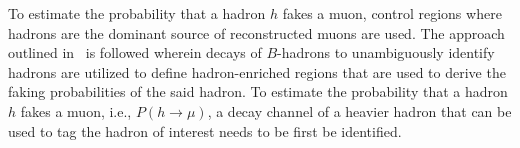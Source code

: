 To estimate the probability that a hadron \( h \) fakes a muon, control regions where hadrons are the dominant source of reconstructed muons are used.
The approach outlined in~\cite{run2muonfakes} is followed wherein decays of $B$-hadrons to unambiguously identify hadrons are utilized to define hadron-enriched regions that are used to derive the faking probabilities of the said hadron. %
To estimate the probability that a hadron $h$ fakes a muon, i.e., $P(h\rightarrow\mu)$, a decay channel of a heavier hadron that can be used to tag the hadron of interest needs to be first be identified. %
